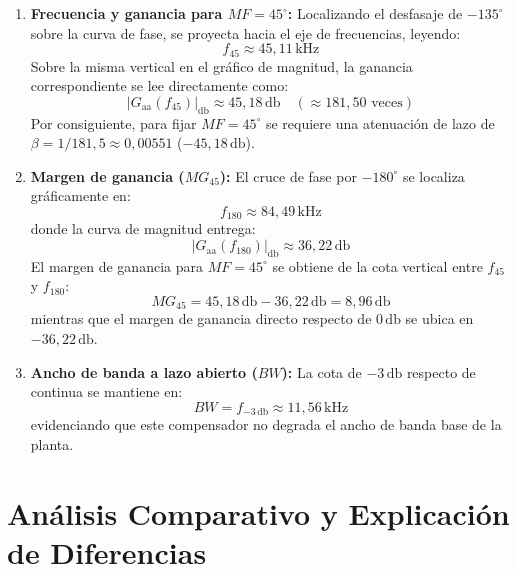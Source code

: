 \begin{enumerate}
    \item \textbf{Frecuencia y ganancia para $MF = 45^\circ$:} Localizando el desfasaje de $-135^\circ$ sobre la curva de fase,
    se proyecta hacia el eje de frecuencias, leyendo:
    \begin{equation}
        f_{45} \approx 45,11\,\si{\kilo\hertz}
    \end{equation}
    Sobre la misma vertical en el gráfico de magnitud, la ganancia correspondiente se lee directamente como:
    \begin{equation}
        |G_{\text{aa}}(f_{45})|_{\si{\decibel}} \approx 45,18\,\si{\decibel} \quad (\approx 181,50\text{ veces})
    \end{equation}
    Por consiguiente, para fijar $MF = 45^\circ$ se requiere una atenuación de lazo de $\beta = 1/181,5 \approx 0,00551$ ($-45,18\,\si{\decibel}$).

    \item \textbf{Margen de ganancia ($MG_{45}$):} El cruce de fase por $-180^\circ$ se localiza gráficamente en:
    \begin{equation}
        f_{180} \approx 84,49\,\si{\kilo\hertz}
    \end{equation}
    donde la curva de magnitud entrega:
    \begin{equation}
        |G_{\text{aa}}(f_{180})|_{\si{\decibel}} \approx 36,22\,\si{\decibel}
    \end{equation}
    El margen de ganancia para $MF = 45^\circ$ se obtiene de la cota vertical entre $f_{45}$ y $f_{180}$:
    \begin{equation}
        MG_{45} = 45,18\,\si{\decibel} - 36,22\,\si{\decibel} = 8,96\,\si{\decibel}
    \end{equation}
    mientras que el margen de ganancia directo respecto de $0\,\si{\decibel}$ se ubica en $-36,22\,\si{\decibel}$.

    \item \textbf{Ancho de banda a lazo abierto ($BW$):} La cota de $-3\,\si{\decibel}$ respecto de continua se mantiene en:
    \begin{equation}
        BW = f_{-3\,\si{\decibel}} \approx 11,56\,\si{\kilo\hertz}
    \end{equation}
    evidenciando que este compensador no degrada el ancho de banda base de la planta.
\end{enumerate}

\clearpage

\section{Análisis Comparativo y Explicación de Diferencias}

